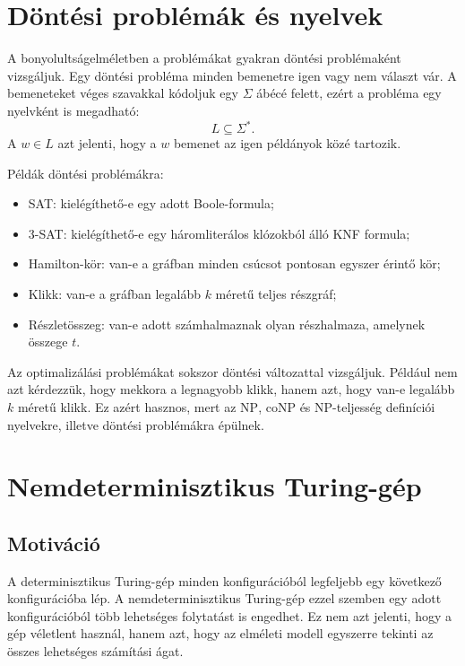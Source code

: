 \section{Döntési problémák és nyelvek}

A bonyolultságelméletben a problémákat gyakran döntési problémaként vizsgáljuk. Egy döntési probléma minden bemenetre igen vagy nem választ vár. A bemeneteket véges szavakkal kódoljuk egy $\Sigma$ ábécé felett, ezért a probléma egy nyelvként is megadható:
\[
  L\subseteq\Sigma^*.
\]
A $w\in L$ azt jelenti, hogy a $w$ bemenet az igen példányok közé tartozik.

Példák döntési problémákra:

\begin{itemize}
  \item SAT: kielégíthető-e egy adott Boole-formula;
  \item 3-SAT: kielégíthető-e egy háromliterálos klózokból álló KNF formula;
  \item Hamilton-kör: van-e a gráfban minden csúcsot pontosan egyszer érintő kör;
  \item Klikk: van-e a gráfban legalább $k$ méretű teljes részgráf;
  \item Részletösszeg: van-e adott számhalmaznak olyan részhalmaza, amelynek összege $t$.
\end{itemize}

Az optimalizálási problémákat sokszor döntési változattal vizsgáljuk. Például nem azt kérdezzük, hogy mekkora a legnagyobb klikk, hanem azt, hogy van-e legalább $k$ méretű klikk. Ez azért hasznos, mert az $\mathrm{NP}$, $\mathrm{coNP}$ és NP-teljesség definíciói nyelvekre, illetve döntési problémákra épülnek.

\section{Nemdeterminisztikus Turing-gép}

\subsection{Motiváció}

A determinisztikus Turing-gép minden konfigurációból legfeljebb egy következő konfigurációba lép. A nemdeterminisztikus Turing-gép ezzel szemben egy adott konfigurációból több lehetséges folytatást is engedhet. Ez nem azt jelenti, hogy a gép véletlent használ, hanem azt, hogy az elméleti modell egyszerre tekinti az összes lehetséges számítási ágat.

